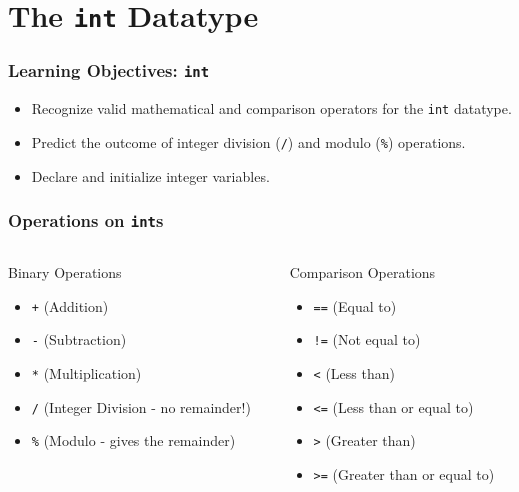 \documentclass{beamer}
\begin{document}
\section{The \texttt{int} Datatype}

\begin{frame}
\frametitle{Learning Objectives: \texttt{int}}
\begin{itemize}
    \item Recognize valid mathematical and comparison operators for the \texttt{int} datatype.\pause
    \item Predict the outcome of integer division (\texttt{/}) and modulo (\texttt{\%}) operations.\pause
    \item Declare and initialize integer variables.
\end{itemize}
\end{frame}

\begin{frame}
\frametitle{Operations on \texttt{int}s}
\begin{columns}[T]
    \begin{column}{0.5\textwidth}
        \begin{alertblock}{Binary Operations}
        \begin{itemize}
            \item \texttt{+} (Addition)
            \item \texttt{-} (Subtraction)
            \item \texttt{*} (Multiplication)
            \item \texttt{/} (Integer Division - no remainder!)
            \item \texttt{\%} (Modulo - gives the remainder)
        \end{itemize}
        \end{alertblock}
    \end{column}\pause
    \begin{column}{0.5\textwidth}
        \begin{exampleblock}{Comparison Operations}
        \begin{itemize}
            \item \texttt{==} (Equal to)
            \item \texttt{!=} (Not equal to)
            \item \texttt{<} (Less than)
            \item \texttt{<=} (Less than or equal to)
            \item \texttt{>} (Greater than)
            \item \texttt{>=} (Greater than or equal to)
        \end{itemize}
        \end{exampleblock}
    \end{column}
\end{columns}
\end{frame}
\end{document}
